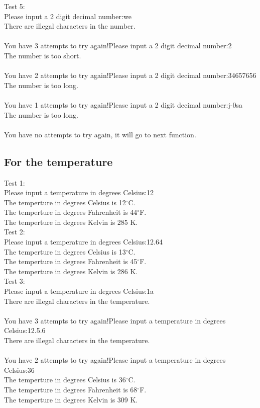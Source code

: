 \documentclass[12pt]{article}
\begin{document}
	\noindent Test 5:\\
	Please input a 2 digit decimal number:we\\
	There are illegal characters in the number.\\\\	
	You have 3 attempts to try again!Please input a 2 digit decimal number:2\\
	The number is too short.\\\\	
	You have 2 attempts to try again!Please input a 2 digit decimal number:34657656\\
	The number is too long.\\\\	
	You have 1 attempts to try again!Please input a 2 digit decimal number:j-0sa\\
	The number is too long.\\\\	
	You have no attempts to try again, it will go to next function.
	
	\subsection{For the temperature}
	\noindent Test 1:\\
	Please input a temperature in degrees Celsius:12\\
	The temperture in degrees Celsius is 12$^\circ$C.\\
	The temperture in degrees Fahrenheit is 44$^\circ$F.\\
	The temperture in degrees Kelvin is 285 K.\\
	
	\noindent Test 2:\\
	Please input a temperature in degrees Celsius:12.64\\
	The temperture in degrees Celsius is 13$^\circ$C.\\
	The temperture in degrees Fahrenheit is 45$^\circ$F.\\
	The temperture in degrees Kelvin is 286 K.\\
	
	\noindent Test 3:\\
	Please input a temperature in degrees Celsius:1a\\
	There are illegal characters in the temperature.\\\\	
	You have 3 attempts to try again!Please input a temperature in degrees Celsius:12.5.6\\
	There are illegal characters in the temperature.\\\\	
	You have 2 attempts to try again!Please input a temperature in degrees Celsius:36\\
	The temperture in degrees Celsius is 36$^\circ$C.\\
	The temperture in degrees Fahrenheit is 68$^\circ$F.\\
	The temperture in degrees Kelvin is 309 K.\\
	
\end{document}
